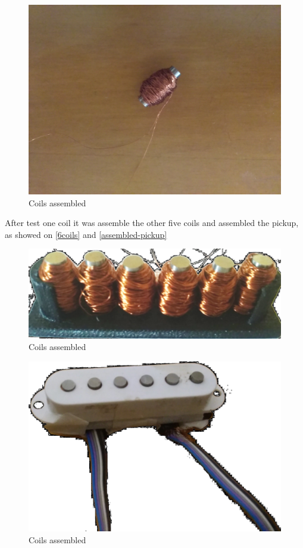 \begin{figure}[!htpb]
  \centering
  \caption{Coils assembled}
  \label{coils}
  \includegraphics[scale=0.08]{images/coils}
\end{figure}

After test one coil it was assemble the other five coils and assembled the pickup, as
showed on \autoref{6coils} and \autoref{assembled-pickup}

\begin{figure}[!htpb]
  \centering
  \caption{Coils assembled}
  \label{6coils}
  \includegraphics[scale=0.08]{images/6coils}
\end{figure}

\begin{figure}[!htpb]
  \centering
  \caption{Coils assembled}
  \label{assembled-pickup}
  \includegraphics[scale=0.08]{images/assembled-pickup}
\end{figure}
